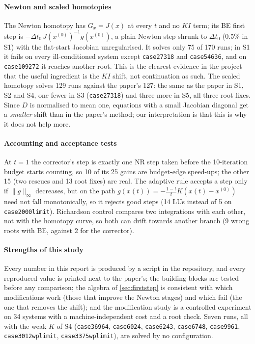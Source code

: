 \documentclass[sigconf,nonacm]{acmart}
\newcommand{\ninf}[1]{\lVert #1\rVert_\infty}
\newcommand{\xo}{x^{(0)}}
\newcommand{\code}[1]{\texttt{#1}}
\begin{document}
\paragraph{Newton and scaled homotopies} The Newton homotopy has $G_x=J(x)$ at every $t$ and no $KI$ term;
its BE first step is $-\Delta t_0\,J(\xo)^{-1}g(\xo)$, a plain Newton step shrunk to $\Delta t_0$ (0.5\% in
S1) with the flat-start Jacobian unregularised. It solves only 75 of 170 runs; in S1 it fails on every
ill-conditioned system except \code{case27318} and \code{case54636}, and on \code{case109272} it reaches
another root. This is the clearest evidence in the project that the useful ingredient is the $KI$ shift, not
continuation as such. The scaled homotopy solves 129 runs against the paper's 127: the same as the paper in
S1, S2 and S4, one fewer in S3 (\code{case27318}) and three more in S5, all three root fixes. Since $D$ is
normalised to mean one, equations with a small Jacobian diagonal get a \emph{smaller} shift than in the
paper's method; our interpretation is that this is why it does not help more.

\paragraph{Accounting and acceptance tests} At $t=1$ the corrector's step is exactly one NR step taken
before the 10-iteration budget starts counting, so 10 of its 25 gains are budget-edge speed-ups; the other 15
(two rescues and 13 root fixes) are real. The adaptive rule accepts a step only if $\ninf{g}$ decreases, but on
the path $g(x(t))=-\tfrac{1-t}{t}K(x(t)-\xo)$ need not fall monotonically, so it rejects good steps (14 LUs
instead of 5 on \code{case2000limit}). Richardson control compares two integrations with each other, not with
the homotopy curve, so both can drift towards another branch (9 wrong roots with BE, against 2 for the
corrector).

\paragraph{Strengths of this study} Every number in this report is produced by a script in the repository,
and every reproduced value is printed next to the paper's; the building blocks are tested before any
comparison; the algebra of \cref{sec:firststep} is consistent with which modifications work (those that
improve the Newton stages) and which fail (the one that removes the shift); and the modification study is a
controlled experiment on 34 systems with a machine-independent cost and a root check. Seven runs, all with the
weak $K$ of S4 (\code{case36964}, \code{case6024}, \code{case6243}, \code{case6748}, \code{case9961},
\code{case3012wplimit}, \code{case3375wplimit}), are solved by no configuration.
\end{document}
